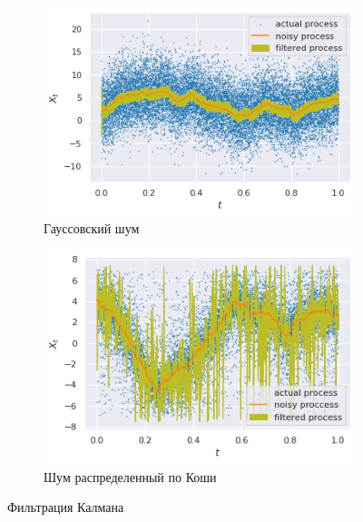 \begin{figure}[tbp]
	\centering
	\begin{subfigure}[b]{0.48\textwidth}
		\centering
		\includegraphics[width=\textwidth]{resources/task10_kalman_normal.png}
		\caption{Гауссовский шум}
	\end{subfigure}
	\hfill
	\begin{subfigure}[b]{0.48\textwidth}
		\centering
		\includegraphics[width=\textwidth]{resources/task10_kalman_cauchy.png}
		\caption{Шум распределенный по Коши}
	\end{subfigure}
	\caption{Фильтрация Калмана}
	\label{filter}
\end{figure}
